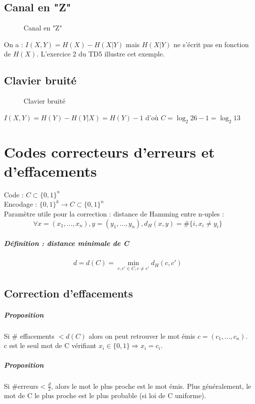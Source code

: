 \documentclass[12pt,a4paper]{report}
\begin{document}
\section{Canal en "Z"}
\begin{figure}[h]
	\centering
  \scalebox{0.8}{}	
  \caption{Canal en "Z"}
\end{figure}
On a : $ I(X,Y)=H(X)-H(X|Y) $ mais $H(X|Y) $ ne s'écrit pas en fonction de $H(X)$. L'exercice 2 du TD5 illustre cet exemple.
\section{Clavier bruité}
\begin{figure}[h]
	\centering
  \scalebox{0.6}{}	
  \caption{Clavier bruité}
\end{figure}
$I(X,Y)=H(Y)-H(Y|X) = H(Y)-1 $ d'où $ C= \log_2 26 -1 = \log_2 13 $
\chapter{Codes correcteurs d'erreurs et d'effacements}
Code : $C \subset \{0,1\}^n $\\
Encodage : $ \{0,1\}^k \rightarrow C \subset \{0,1\}^n$\\
Paramètre utile pour la correction : distance de Hamming entre n-uples :
$$ \forall x=(x_1,\ldots,x_n), y=(y_1,\ldots,y_n), d_H(x,y) = \# \{i,x_i \neq y_i\} $$
\paragraph{Définition : distance minimale de C}
$$d=d(C)=\min_{c,c'\in C, c \neq c'} d_H(c,c')$$
\section*{Correction d'effacements\\}
\paragraph{Proposition\\}
Si $ \# $ effacements $< d(C)$ alors on peut retrouver le mot émis $c=(c_1,\ldots,c_n)$. c est le seul mot de C vérifiant $x_i\in \{0,1\} \Rightarrow x_i=c_i$.
\paragraph{Proposition\\}
Si $\#$erreurs$ < \frac{d}{2}$, alors le mot le plus proche est le mot émis. Plus généralement, le mot de C le plus proche est le plus probable (si loi de C uniforme).
\end{document}
